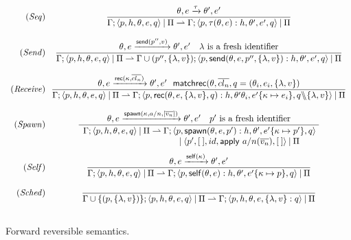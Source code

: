 \documentclass[runningheads]{llncs}
\newcommand{\sslash}{\mathbin{\mkern-4mu \backslash \mkern-6mu \backslash \mkern-4mu}}
\newcommand{\arro}[1]{\xrightarrow{#1}}
\newcommand{\comp}{\:|\:}
\newcommand{\rfpair}[2]{(#1,#2)}
\newcommand{\set}[1]{\{#1\}}
\newcommand{\ms}[1]{\mathsf{#1}}
\newcommand{\rh}{\rightharpoonup}
\def \tuple#1{\langle #1 \rangle}
\newcommand{\nill}{[\:]}
\begin{document}
\begin{figure}[t]
\centering
\small
  $
  \begin{array}{r@{~~}c}
  	
  (\mathit{Seq}) & \displaystyle
  \frac{\theta,e \arro{\tau}\theta',e'}{\Gamma; \tuple{p, h, \theta,e, q} \comp \Pi \rh \Gamma; \tuple{p, \tau(\theta,e): h, \theta',e', q} \comp \Pi}\\[4ex]
  
  (\mathit{Send}) & \displaystyle
  \frac{\theta,e \arro{\ms{send}(p'',v)}\theta',e'~~~\lambda~\text{is a fresh identifier}} 
  {\Gamma; \tuple{p, h, \theta,e, q} \comp \Pi \rh \Gamma\cup\rfpair{p''}{\{\lambda,v\} }; \tuple{p, \ms{send}(\theta,e,p'',\{\lambda,v\}): h, \theta',e', q} \comp \Pi}\\[4ex]
 
  (\mathit{Receive}) & \displaystyle
  \frac{\theta,e \arro{\ms{rec}(\kappa,\overline{cl_n})}\theta',e'~~\ms{matchrec}(\theta,\overline{cl_n},q=(\theta_i,e_i,\{\lambda,v\})} 
  {\Gamma; \tuple{p, h, \theta,e, q} \comp \Pi \rh \Gamma; \tuple{p, \ms{rec}(\theta,e,\{\lambda,v\},q): h, \theta'\theta_i,e'\{\kappa \mapsto e_i\}, q \sslash \set{\lambda,v}} \comp \Pi}\\[4ex]
   
  (\mathit{Spawn}) & {\displaystyle
  \frac{\theta,e \arro{\ms{spawn}(\kappa, a/n, [\overline{v_n}])}\theta',e'~~~p'\text{ is a fresh identifier}}
  {\begin{array}{l@{~}l}
   	\Gamma; \tuple{p, h, \theta,e, q} \comp \Pi \rh \Gamma; \tuple{p, \ms{spawn}(\theta,e, p'): h, \theta',e'\{\kappa \mapsto p'\}, q}\\
  	  \hspace{25ex}\comp \tuple{p', \nill, id,\ms{apply}~a/n (\overline{v_n}), \nill } \comp \Pi
  	\end{array}
  	}}\\[6ex]
  
	(\mathit{Self}) & \displaystyle
  	\frac{\theta,e \arro{\ms{self}(\kappa)}\theta',e'}
  	{\Gamma; \tuple{p, h, \theta,e, q} \comp \Pi \rh \Gamma; \tuple{p, \ms{self}(\theta,e): h, \theta',e'\set{\kappa \mapsto p}, q} \comp \Pi}\\[4ex]
    
    (\mathit{Sched}) & \displaystyle
  	\frac{}
  	{\Gamma\cup\set{\rfpair{p}{\set{\lambda,v}}}; \tuple{p, h, \theta, e, q} \comp \Pi \rh \Gamma; \tuple{p,h, \theta,e, \set{\lambda,v}:q} \comp \Pi}\\[4ex]
    \end{array}
  $
\caption{Forward reversible semantics.}
\label{fig:fwd-semantics}
\end{figure}
\end{document}
